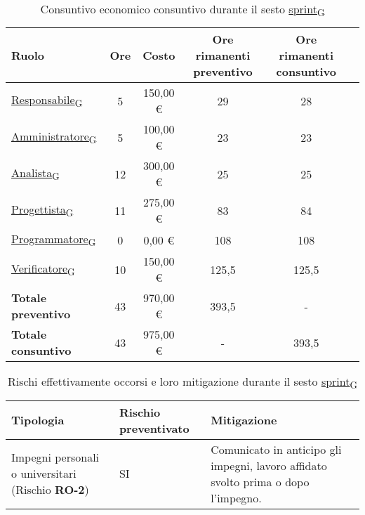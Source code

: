 \begin{table}[!h]
    \centering
    \begin{tabular}{ | l | c | c | c | c | c | }
        \hline
        \textbf{Ruolo} & \textbf{Ore} & \textbf{Costo} & \textbf{Ore rimanenti preventivo} & \textbf{Ore rimanenti consuntivo} \\
        \hline
        \href{https://7last.github.io/docs/rtb/documentazione-interna/glossario\#responsabile}{Responsabile\textsubscript{G}}			&  5   &    150,00 € &   29   &   28   \\
        \href{https://7last.github.io/docs/rtb/documentazione-interna/glossario\#amministratore}{Amministratore\textsubscript{G}}		&  5   &    100,00 € &   23   &   23   \\
        \href{https://7last.github.io/docs/rtb/documentazione-interna/glossario\#analista}{Analista\textsubscript{G}}                   &  12   &    300,00 € &   25   &   25   \\
        \href{https://7last.github.io/docs/rtb/documentazione-interna/glossario\#progettista}{Progettista\textsubscript{G}}                										  &  11   &    275,00 € &   83   &   84   \\
        \href{https://7last.github.io/docs/rtb/documentazione-interna/glossario\#programmatore}{Programmatore\textsubscript{G}}              										  &  0   &    0,00 € &   108   &   108   \\
        \href{https://7last.github.io/docs/rtb/documentazione-interna/glossario\#verificatore}{Verificatore\textsubscript{G}}               &  10   &    150,00 € &   125,5   &   125,5   \\
        \hline
        \textbf{Totale preventivo} &  43   &    970,00 € &   393,5   &   -   \\
        \hline
        \textbf{Totale consuntivo} &  43   &    975,00 € &   -   &   393,5   \\
        \hline
    \end{tabular}
    \caption{Consuntivo economico consuntivo durante il sesto \href{https://7last.github.io/docs/rtb/documentazione-interna/glossario\#sprint}{sprint\textsubscript{G}}}

\end{table}
\newpage
{} %
\begin{table}[!h]
    \centering
    \begin{tabular}{ | p{6cm} | p{2.5cm} | p{7.5cm} | }
        \hline
        \textbf{Tipologia} & \textbf{Rischio preventivato} & \textbf{Mitigazione}  \\
        \hline
        Impegni personali o universitari (Rischio \textbf{RO-2})& SI & Comunicato in anticipo gli impegni, lavoro affidato svolto prima o dopo l’impegno. \\
        \hline
    \end{tabular}
    \caption{Rischi effettivamente occorsi e loro mitigazione durante il sesto \href{https://7last.github.io/docs/rtb/documentazione-interna/glossario\#sprint}{sprint\textsubscript{G}}}
\end{table}


